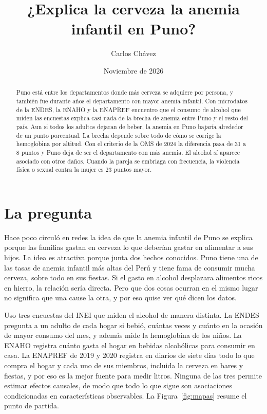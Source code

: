 \documentclass[11pt]{article}
\title{¿Explica la cerveza la anemia infantil en Puno?}
\author{Carlos Chávez}
\date{Noviembre de 2026}
\begin{document}
\maketitle

\begin{abstract}
\noindent Puno está entre los departamentos donde más cerveza se adquiere por persona, y también fue durante años el departamento con mayor anemia infantil. Con microdatos de la ENDES, la ENAHO y la ENAPREF encuentro que el consumo de alcohol que miden las encuestas explica casi nada de la brecha de anemia entre Puno y el resto del país. Aun si todos los adultos dejaran de beber, la anemia en Puno bajaría alrededor de un punto porcentual. La brecha depende sobre todo de cómo se corrige la hemoglobina por altitud. Con el criterio de la OMS de 2024 la diferencia pasa de 31 a 8 puntos y Puno deja de ser el departamento con más anemia. El alcohol sí aparece asociado con otros daños. Cuando la pareja se embriaga con frecuencia, la violencia física o sexual contra la mujer es 23 puntos mayor.
\end{abstract}

\section{La pregunta}

Hace poco circuló en redes la idea de que la anemia infantil de Puno se explica porque las familias gastan en cerveza lo que deberían gastar en alimentar a sus hijos. La idea es atractiva porque junta dos hechos conocidos. Puno tiene una de las tasas de anemia infantil más altas del Perú y tiene fama de consumir mucha cerveza, sobre todo en sus fiestas. Si el gasto en alcohol desplazara alimentos ricos en hierro, la relación sería directa. Pero que dos cosas ocurran en el mismo lugar no significa que una cause la otra, y por eso quise ver qué dicen los datos.

Uso tres encuestas del INEI que miden el alcohol de manera distinta. La ENDES pregunta a un adulto de cada hogar si bebió, cuántas veces y cuánto en la ocasión de mayor consumo del mes, y además mide la hemoglobina de los niños. La ENAHO registra cuánto gasta el hogar en bebidas alcohólicas para consumir en casa. La ENAPREF de 2019 y 2020 registra en diarios de siete días todo lo que compra el hogar y cada uno de sus miembros, incluida la cerveza en bares y fiestas, y por eso es la mejor fuente para medir litros. Ninguna de las tres permite estimar efectos causales, de modo que todo lo que sigue son asociaciones condicionadas en características observables. La Figura~\ref{fig:mapas} resume el punto de partida.
\end{document}
